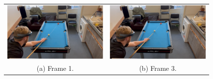 \documentclass[ %
                author={Finn Alexander Wilkinson},
                supervisor={Dr. Andrew Calway},
                degree={MEng},
                title={\centering A Mixed Reality Aim Assistant for Pool and Snooker},
                subtitle={},
                type={Enterprise},
                year={2021} ]{dissertation}
\begin{document}
\begin{figure}[h!]
    \centering
    \begin{tabular}{cc}
         \includegraphics[scale = 0.15]{Images/Eval/Path Estimate/Cross Table/Frame 1.PNG} & \includegraphics[scale = 0.15]{Images/Eval/Path Estimate/Cross Table/Frame 3.PNG} \\
         (a) Frame 1. & (b) Frame 3. \\ [6pt]

\end{tabular}
\end{figure}
\end{document}
